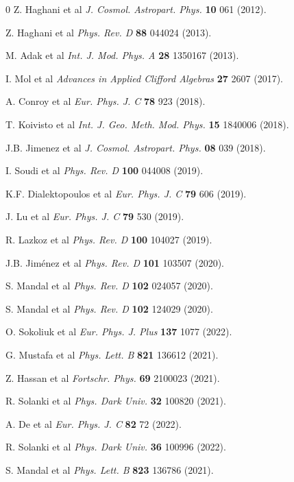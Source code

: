 \documentclass[aps,prd,showpacs,nofootinbib,floats,floatfix,preprintnumbers,groupedaddress,twocolumn]{revtex4-1}
\begin{document}
\begin{thebibliography}{0}
Z. Haghani et al \textit{J. Cosmol. Astropart. Phys.} \textbf{10} 061 (2012).

Z. Haghani et al \textit{Phys. Rev. D} \textbf{88} 044024 (2013).

M. Adak et al \textit{Int. J. Mod. Phys. A} \textbf{28} 1350167 (2013).

I. Mol et al \textit{Advances in Applied Clifford Algebras} \textbf{27} 2607 (2017).

A. Conroy et al \textit{Eur. Phys. J. C} \textbf{78} 923 (2018). 

T. Koivisto et al \textit{Int. J. Geo. Meth. Mod. Phys.} \textbf{15} 1840006 (2018).

J.B. Jimenez et al \textit{J. Cosmol. Astropart. Phys.} \textbf{08} 039 (2018).

I. Soudi et al \textit{Phys. Rev. D} \textbf{100} 044008 (2019).

K.F. Dialektopoulos et al \textit{Eur. Phys. J. C} \textbf{79} 606 (2019).

J. Lu et al \textit{Eur. Phys. J. C} \textbf{79} 530 (2019).

R. Lazkoz et al \textit{Phys. Rev. D} \textbf{100} 104027 (2019).

J.B. Jiménez et al \textit{Phys. Rev. D} \textbf{101} 103507 (2020).

S. Mandal et al \textit{Phys. Rev. D} \textbf{102} 024057 (2020).

S. Mandal et al \textit{Phys. Rev. D} \textbf{102} 124029 (2020).

O. Sokoliuk et al \textit{Eur. Phys. J. Plus} \textbf{137} 1077 (2022). 

G. Mustafa et al \textit{Phys. Lett. B} \textbf{821} 136612 (2021).

Z. Hassan et al \textit{Fortschr. Phys.} \textbf{69} 2100023 (2021).

R. Solanki et al \textit{Phys. Dark Univ.} \textbf{32} 100820 (2021).

A. De et al \textit{Eur. Phys. J. C} \textbf{82} 72 (2022).

R. Solanki et al \textit{Phys. Dark Univ.} \textbf{36} 100996 (2022).

S. Mandal et al \textit{Phys. Lett. B} \textbf{823} 136786 (2021).


\end{thebibliography}
\end{document}

